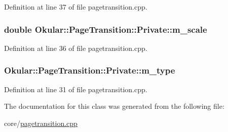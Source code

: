 Definition at line 37 of file pagetransition.\+cpp.

\hypertarget{classPageTransition_1_1Private_a196e45f3f2d1afc93d9056ce05bc77c2}{
\subsubsection[{m\+\_\+scale}]{\setlength{\rightskip}{0pt plus 5cm}double Okular\+::\+Page\+Transition\+::\+Private\+::m\+\_\+scale}}\label{classPageTransition_1_1Private_a196e45f3f2d1afc93d9056ce05bc77c2}


Definition at line 36 of file pagetransition.\+cpp.

\hypertarget{classPageTransition_1_1Private_aee935e73b9f60a38c1eeb687abd64506}{
\subsubsection[{m\+\_\+type}]{ Okular\+::\+Page\+Transition\+::\+Private\+::m\+\_\+type}}\label{classPageTransition_1_1Private_aee935e73b9f60a38c1eeb687abd64506}


Definition at line 31 of file pagetransition.\+cpp.



The documentation for this class was generated from the following file\+:\begin{DoxyCompactItemize}
\item 
core/\hyperlink{pagetransition_8cpp}{pagetransition.\+cpp}\end{DoxyCompactItemize}
